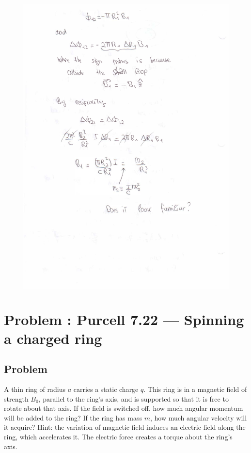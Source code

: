 \documentclass[solutions]{esg8022pset}
\begin{document}
    \begin{figure}[H]
    \centering
    \includegraphics[width = 25cm]{ps9_7b}
  \end{figure}
\section{Problem \thesection: Purcell 7.22 --- Spinning a charged ring}
\subsection{Problem}
A thin ring of radius $a$ carries a static charge $q$. This ring is in a magnetic field of strength $B_0$, parallel to the ring's axis, and is supported so that it is free to rotate about that axis. If the field is switched off, how much angular momentum will be added to the ring? If the ring has mass $m$, how much angular velocity will it acquire?
Hint: the variation of magnetic field induces an
electric field along the ring, which accelerates it. The electric force creates a torque about the ring's axis.
\end{document}
